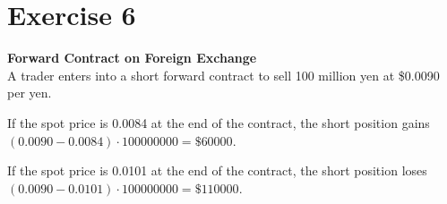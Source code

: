 \documentclass{article}
\begin{document}
\section*{Exercise 6}
\begin{flushleft}
    \textbf{Forward Contract on Foreign Exchange} \\
    A trader enters into a short forward contract to sell 100 million yen at \$0.0090 per yen.
    \begin{list}{}
        \item If the spot price is 0.0084 at the end of the contract, the short position gains $(0.0090 - 0.0084) \cdot 100000000 = \$ 60000$.
        \item If the spot price is 0.0101 at the end of the contract, the short position loses $(0.0090 - 0.0101) \cdot 100000000 = \$ 110000$.
    \end{list}
\end{flushleft}
\end{document}
